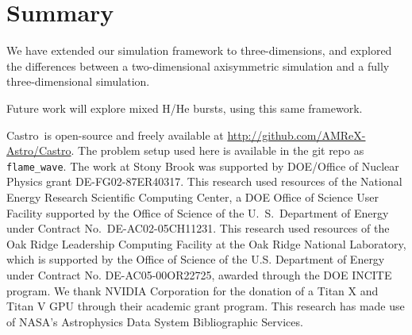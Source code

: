 \documentclass[preprint,times,tighten]{aastex631}
\newcommand{\castro}{{\sf Castro}}
\begin{document}
\section{Summary}

We have extended our simulation framework to three-dimensions, and
explored the differences between a two-dimensional axisymmetric
simulation and a fully three-dimensional simulation.

Future work will explore mixed H/He bursts, using this same framework.

\begin{acknowledgements}
\castro\ is open-source and freely available at
\url{http://github.com/AMReX-Astro/Castro}.  The problem setup used
here is available in the git repo as {\tt flame\_wave}.  The work at
Stony Brook was supported by DOE/Office of Nuclear Physics grant
DE-FG02-87ER40317.  This research used resources of the National
Energy Research Scientific Computing Center, a DOE Office of Science
User Facility supported by the Office of Science of the
U.~S.\ Department of Energy under Contract No.\ DE-AC02-05CH11231.
This research used resources of the Oak Ridge Leadership Computing
Facility at the Oak Ridge National Laboratory, which is supported by
the Office of Science of the U.S. Department of Energy under Contract
No. DE-AC05-00OR22725, awarded through the DOE INCITE program.  We
thank NVIDIA Corporation for the donation of a Titan X and Titan V GPU
through their academic grant program.  This research has made use of
NASA's Astrophysics Data System Bibliographic Services.
\end{acknowledgements}








\end{document}
